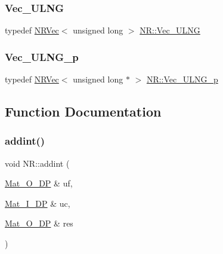 \subsubsection{\texorpdfstring{Vec\_ULNG}{Vec\_ULNG}}
{\footnotesize\ttfamily typedef \mbox{\hyperlink{classNR_1_1NRVec}{N\+R\+Vec}}$<$ unsigned long $>$ \mbox{\hyperlink{namespaceNR_a5c7370f8964ba27e0aa18ff2b2516734}{N\+R\+::\+Vec\+\_\+\+U\+L\+NG}}}

\mbox{\label{namespaceNR_a4441bfbfcee00b3bdb45e5da10532ebe}} 
\subsubsection{\texorpdfstring{Vec\_ULNG\_p}{Vec\_ULNG\_p}}
{\footnotesize\ttfamily typedef \mbox{\hyperlink{classNR_1_1NRVec}{N\+R\+Vec}}$<$ unsigned long $\ast$ $>$ \mbox{\hyperlink{namespaceNR_a4441bfbfcee00b3bdb45e5da10532ebe}{N\+R\+::\+Vec\+\_\+\+U\+L\+N\+G\+\_\+p}}}



\subsection{Function Documentation}
\mbox{\label{namespaceNR_aaab613fb80abc0d628e6625e1a9e5f42}} 
\subsubsection{\texorpdfstring{addint()}{addint()}}
{\footnotesize\ttfamily void N\+R\+::addint (\begin{DoxyParamCaption}\item[{\mbox{\hyperlink{namespaceNR_adc1f8da33094b6bbeb1f5f899515ce54}{Mat\+\_\+\+O\+\_\+\+DP}} \&}]{uf,  }\item[{\mbox{\hyperlink{namespaceNR_a2b8abfda8fffad6ba0a1b5a4c0773dbf}{Mat\+\_\+\+I\+\_\+\+DP}} \&}]{uc,  }\item[{\mbox{\hyperlink{namespaceNR_adc1f8da33094b6bbeb1f5f899515ce54}{Mat\+\_\+\+O\+\_\+\+DP}} \&}]{res }\end{DoxyParamCaption})}

\mbox{\label{namespaceNR_a90700ac65b3bb16117cdf03479f37529}} 
